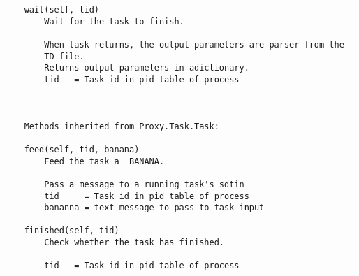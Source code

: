 \documentclass[11pt]{report}
\begin{document}
\begin{verbatim}
    wait(self, tid)
        Wait for the task to finish.
        
        When task returns, the output parameters are parser from the
        TD file.
        Returns output parameters in adictionary.
        tid   = Task id in pid table of process
    
    ----------------------------------------------------------------------
    Methods inherited from Proxy.Task.Task:
    
    feed(self, tid, banana)
        Feed the task a  BANANA.
        
        Pass a message to a running task's sdtin
        tid     = Task id in pid table of process
        bananna = text message to pass to task input
    
    finished(self, tid)
        Check whether the task has finished.
        
        tid   = Task id in pid table of process

\end{verbatim}
\end{document}
